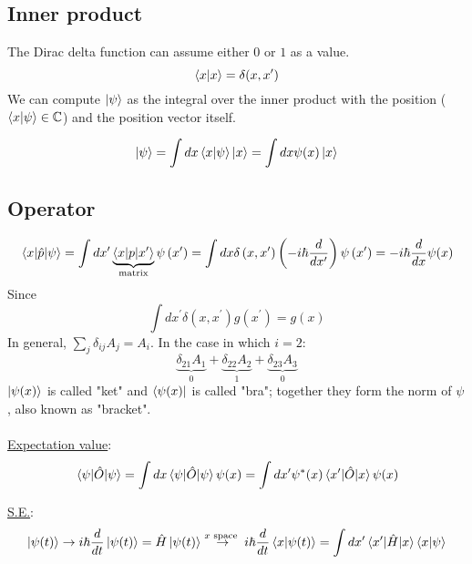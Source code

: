 \subsection{Inner product}
The Dirac delta function can assume either $0$ or $1$ as a value.
$$\bra{x}\ket{x} = \delta (x,x')$$
\noindent
We can compute $\ket{\psi}$ as the integral over the inner product with the position ($\bra{x}\ket{\psi} \in \mathbb{C}$) and the position vector itself.

$$\ket{\psi}= \int d x \bra{x}\ket{\psi} \ket{x} = \int d x \psi(x) \ket{x} $$
\subsection{Operator}
$$\mel{x}{\hat{p}}{\psi}=\int d x^{\prime} \underbrace{\left\langle x|p| x^{\prime}\right\rangle}_{\operatorname{matrix}} \psi\left(x^{\prime}\right)
=\int d x \delta\left(x, x^{\prime}\right)\left(-i \hbar \frac{d}{d x^{\prime}}\right) \psi\left(x^{\prime}\right)
=-i \hbar \frac{d}{d x} \psi(x)$$
Since
$$
\int d x^{\prime} \delta\left(x, x^{\prime}\right) g\left(x^{\prime}\right)=g(x)$$
In general, $\sum_{j} \delta_{i j} A_{j}=A_{i} $. In the case in which $i=2$:
 $$ \underbrace{\delta_{21} A_{1}}_{0}+\underbrace{\delta_{22} A_{2}}_{1}+\underbrace{\delta_{23} A_{3}}_{0}
$$
\noindent
$\ket{\psi(x)}$ is called "ket" and $\bra{\psi(x)}$ is called "bra"; together they form the norm of $\psi$,  also known as "bracket".\\
\\
\underline{Expectation value}:
$$\expval{\hat{O}}{\psi}= \int d x \expval{\hat{O}}{\psi} \psi(x)= \int d x^{\prime} \psi^{*}(x) \mel{x'}{\hat{O}}{x} \psi(x)$$

\underline{S.E.}:
$$ \ket{\psi(t)}\rightarrow i \hbar \frac{d}{d t}\ket{\psi(t)}=\hat{H}\ket{\psi(t)}\stackrel{x \text { space }}{\rightarrow} i \hbar \frac{d}{d t}\bra{x} \ket{\psi(t)}=\int d x^{\prime} \mel{x'}{\hat{H}}{x} \bra{x} \ket{\psi}$$

